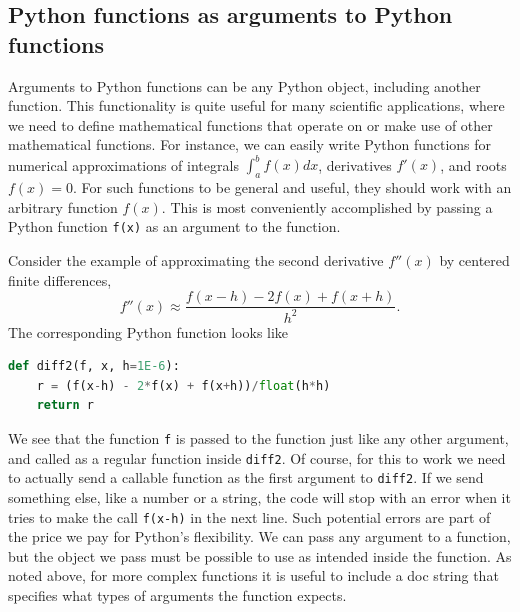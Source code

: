 \documentclass[graybox,envcountchap,sectrefs,final]{svmonodo}
\begin{document}
\subsection{Python functions as arguments to Python functions}
Arguments to Python functions can be any Python object, including another function. This functionality
is quite useful for many scientific applications, where we need to define mathematical
functions that operate on or make use of other mathematical functions. For instance, we can easily
write Python functions for numerical approximations of integrals $\int_a^b f(x)dx$, derivatives $f'(x)$,
and roots $f(x)=0$. For such functions to be general and useful, they should work with an arbitrary function $f(x)$.
This is most conveniently accomplished by passing a Python function \texttt{f(x)} as an argument
to the function.

Consider the example of approximating the second derivative $f''(x)$ by centered finite differences,
\[ f''(x) \approx \frac{f(x-h) - 2f(x) + f(x+h)}{h^2}. \]
The corresponding Python function looks like
\begin{lstlisting}[language=Python,style=blue1]
def diff2(f, x, h=1E-6):
    r = (f(x-h) - 2*f(x) + f(x+h))/float(h*h)
    return r
\end{lstlisting}
We see that the function \texttt{f} is passed to the function just like any other argument, and called as a regular function
inside \texttt{diff2}. Of course, for this to work we need to actually send a callable function as the first
argument to \texttt{diff2}. If we send something else, like a number or  a string, the
code will stop with an error when it tries to make the call \texttt{f(x-h)} in the next line.
Such potential errors are part of the price we pay for Python's flexibility. We can pass any argument
to a function, but the object we pass must be possible to use as intended inside the function. As noted above,
for more complex functions it is useful to include a doc string that specifies what types of arguments the
function expects.
\end{document}

